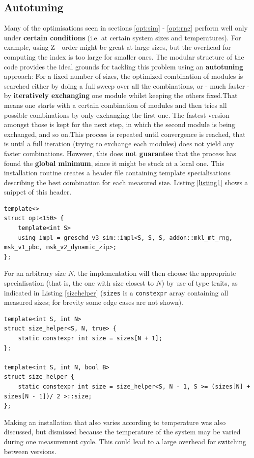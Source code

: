 \documentclass[letterpaper]{article}
\begin{document}
\subsection{Autotuning}\label{opt:autotuning}
Many of the optimisations seen in sections \ref{opt:sim} - \ref{opt:rng} perform well only under \textbf{certain conditions} (i.e. at certain system sizes and temperatures). For example, using Z - order might be great at large sizes, but the overhead for computing the index is too large for smaller ones. \newline
The modular structure of the code provides the ideal grounds for tackling this problem using an \textbf{autotuning} approach:\newline
For a fixed number of sizes, the optimized combination of modules is searched either by doing a full sweep over all the combinations, or - much faster - by \textbf{iteratively exchanging} one module whilst keeping the others fixed.\newline That means one starts with a certain combination of modules and then tries all possible combinations by only exchanging the first one. The fastest version amongst those is kept for the next step, in which the second module is being exchanged, and so on.\newline This process is repeated until convergence is reached, that is until a full iteration (trying to exchange each modules) does not yield any faster combinations. However, this does \textbf{not guarantee} that the process has found the \textbf{global minimum}, since it might be stuck at a local one.\newline 
This installation routine creates a header file containing template specialisations describing the best combination for each measured size. Listing \ref{listing1} shows a snippet of this header.\newline
\begin{lstlisting}[caption = {example for a template specialisation}, label = listing1]
template<>
struct opt<150> {
    template<int S>
    using impl = greschd_v3_sim::impl<S, S, S, addon::mkl_mt_rng, msk_v1_pbc, msk_v2_dynamic_zip>; 
};
\end{lstlisting}
For an arbitrary size $N$, the implementation will then choose the appropriate specialisation (that is, the one with size closest to $N$) by use of type traits, as indicated in Listing \ref{sizehelper} (\texttt{sizes} is a \texttt{constexpr} array containing all measured sizes; for brevity some edge cases are not shown).
\begin{lstlisting}[label = sizehelper, caption = {size\_helper (partial), part of the type traits}]
template<int S, int N>
struct size_helper<S, N, true> {
    static constexpr int size = sizes[N + 1];
};

template<int S, int N, bool B>
struct size_helper {
    static constexpr int size = size_helper<S, N - 1, S >= (sizes[N] + sizes[N - 1])/ 2 >::size;
};
\end{lstlisting}
Making an installation that also varies according to temperature was also discussed, but dismissed because the temperature of the system may be varied during one measurement cycle. This could lead to a large overhead for switching between versions.
\end{document}
